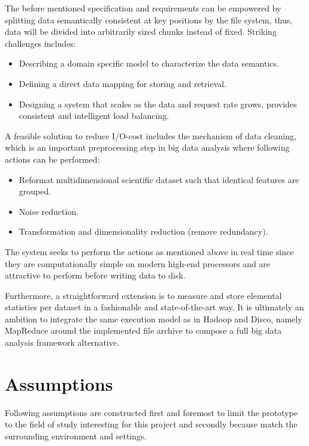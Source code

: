 The before mentioned specification and requirements can be empowered by splitting data semantically consistent at key positions by the file system, thus, data will be divided into arbitrarily sized chunks instead of fixed. Striking challenges includes:
\vspace*{5mm}
\begin{itemize}
	\item Describing a domain specific model to characterize the data semantics.
	\item Defining a direct data mapping for storing and retrieval.
	\item Designing a system that scales as the data and request rate grows, \ie provides consistent and intelligent load balancing.
\end{itemize}
\vspace*{5mm}

A feasible solution to reduce I/O-cost includes the mechanism of data cleaning, which is an important preprocessing step in big data analysis where \ie following actions can be performed:
\vspace*{5mm}
\begin{itemize}
	\item Reformat multidimensional scientific dataset such that identical features are grouped.
	\item Noise reduction.
	\item Transformation and dimensionality reduction (remove redundancy).
\end{itemize}
\vspace*{5mm}

The system seeks to perform the actions as mentioned above in real time since they are computationally simple on modern high-end processors and are attractive to perform before writing data to disk. 
\newline

Furthermore, a straightforward extension is to measure and store elemental statistics per dataset in a fashionable and state-of-the-art way. It is ultimately an ambition to integrate the same execution model as in \eg Hadoop and Disco, namely MapReduce around the implemented file archive to compose a full big data analysis framework alternative.

\section{Assumptions} \label{sec:assumption}
Following assumptions are constructed first and foremost to limit the prototype to the field of study interesting for this project and secondly because match the surrounding environment and settings.

